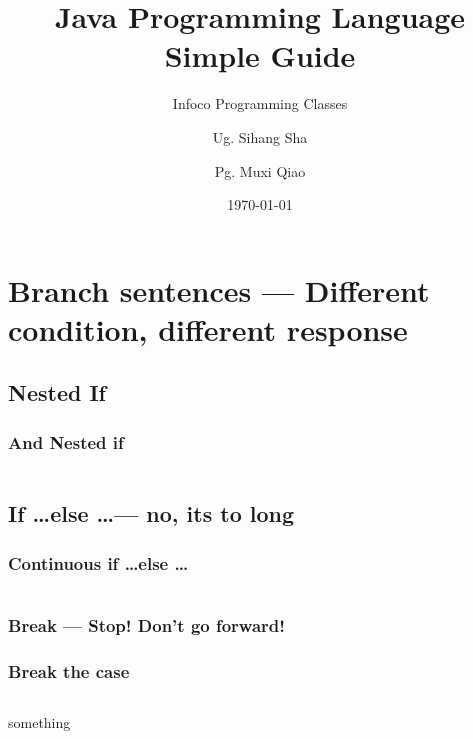 \documentclass[en, 11pt, xcolor=dvipsnames]{beamer}
\title{Java Programming Language \\ Simple Guide} %
\subtitle{Infoco Programming Classes} %
\author{Ug. Sihang Sha \and Pg. Muxi Qiao} %
\institute{Xiann' Jiaotong Livepool University \\ \smallskip \textit{infoco@xjtlu.edu.cn}} %
\date{\today} %
\begin{document}
\maketitle


\section{Branch sentences --- Different condition, different response}

\subsection{Nested If}
\begin{frame}[fragile]
	\frametitle{And Nested if}

	\begin{columns}[c]
		\begin{column}{0.98\textwidth}

		\end{column}
	\end{columns}

\end{frame}

\subsection{If \dots else \dots --- no, its to long}
\begin{frame}
	\frametitle{Continuous if \dots else \dots}

	\begin{columns}[c]
		\begin{column}{0.98\textwidth}

		\end{column}
	\end{columns}

\end{frame}

\subsubsection{Break --- Stop! Don't go forward!}
\begin{frame}
	\frametitle{Break the case}

	\begin{columns}[c]
		\begin{column}{0.98\textwidth}
			something

		\end{column}
	\end{columns}
\end{frame}
\end{document}
